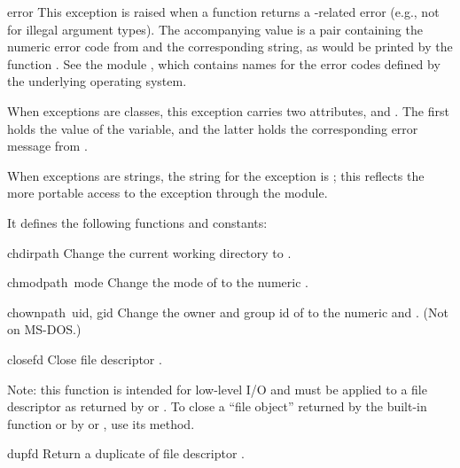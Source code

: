 \begin{excdesc}{error}
This exception is raised when a \POSIX{} function returns a
\POSIX{}-related error (e.g., not for illegal argument types).  The
accompanying value is a pair containing the numeric error code from
 and the corresponding string, as would be printed by the
\C{} function .  See the module
, which contains names for the
error codes defined by the underlying operating system.

When exceptions are classes, this exception carries two attributes,
 and .  The first holds the value of
the \C{}  variable, and the latter holds the
corresponding error message from .

When exceptions are strings, the string for the exception is
; this reflects the more portable access to the
exception through the  module.
\end{excdesc}

It defines the following functions and constants:

\begin{funcdesc}{chdir}{path}
Change the current working directory to .
\end{funcdesc}

\begin{funcdesc}{chmod}{path\, mode}
Change the mode of  to the numeric .
\end{funcdesc}

\begin{funcdesc}{chown}{path\, uid, gid}
Change the owner and group id of  to the numeric 
and .
(Not on MS-DOS.)
\end{funcdesc}

\begin{funcdesc}{close}{fd}
Close file descriptor .

Note: this function is intended for low-level I/O and must be applied
to a file descriptor as returned by  or
.  To close a ``file object'' returned by the
built-in function  or by  or
, use its  method.
\end{funcdesc}

\begin{funcdesc}{dup}{fd}
Return a duplicate of file descriptor .
\end{funcdesc}

